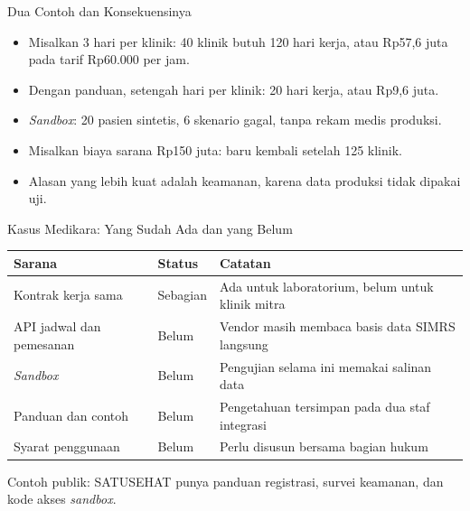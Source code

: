 \documentclass[aspectratio=169, table, 12pt]{beamer}
\begin{document}
\begin{frame}{{\Large Dua Contoh dan Konsekuensinya}}
  \vspace{10pt}
  \begin{itemize}
    \item Misalkan 3 hari per klinik: 40 klinik butuh 120 hari kerja, atau Rp57,6 juta pada tarif Rp60.000 per jam.
    \item Dengan panduan, setengah hari per klinik: 20 hari kerja, atau Rp9,6 juta.
    \item \textit{Sandbox}: 20 pasien sintetis, 6 skenario gagal, tanpa rekam medis produksi.
    \item Misalkan biaya sarana Rp150 juta: baru kembali setelah 125 klinik.
    \item Alasan yang lebih kuat adalah keamanan, karena data produksi tidak dipakai uji.
  \end{itemize}
\end{frame}

\begin{frame}{{\Large Kasus Medikara: Yang Sudah Ada dan yang Belum}}
  \footnotesize
  \begin{tabularx}{\textwidth}{>{\raggedright\arraybackslash}p{4.0cm}
      >{\raggedright\arraybackslash}p{1.8cm} >{\raggedright\arraybackslash}X}
    \hline
    \textbf{Sarana} & \textbf{Status} & \textbf{Catatan} \\ \hline
    Kontrak kerja sama & Sebagian & Ada untuk laboratorium, belum untuk klinik mitra \\ \hline
    API jadwal dan pemesanan & Belum & Vendor masih membaca basis data SIMRS langsung \\ \hline
    \textit{Sandbox} & Belum & Pengujian selama ini memakai salinan data \\ \hline
    Panduan dan contoh & Belum & Pengetahuan tersimpan pada dua staf integrasi \\ \hline
    Syarat penggunaan & Belum & Perlu disusun bersama bagian hukum \\ \hline
  \end{tabularx}

  \vspace{8pt}
  \small Contoh publik: SATUSEHAT punya panduan registrasi, survei keamanan, dan kode akses \textit{sandbox}.
\end{frame}
\end{document}
